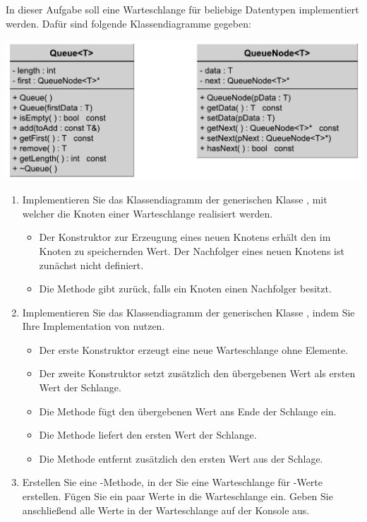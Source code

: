 In dieser Aufgabe soll eine Warteschlange für beliebige Datentypen implementiert werden.
Dafür sind folgende Klassendiagramme gegeben:

\begin{center}
	\includegraphics[keepaspectratio,scale=0.6]{Queue-uml.pdf}
\end{center}

\begin{enumerate}
	\item Implementieren Sie das Klassendiagramm der generischen Klasse , mit welcher die Knoten einer Warteschlange realisiert werden.
	\begin{itemize}
		\item Der Konstruktor zur Erzeugung eines neuen Knotens erhält den im Knoten zu speichernden Wert. Der Nachfolger eines neuen Knotens ist zunächst nicht definiert.
		\item Die Methode  gibt  zurück, falls ein Knoten einen Nachfolger besitzt.
	\end{itemize}
	\item Implementieren Sie das Klassendiagramm der generischen Klasse , indem Sie Ihre Implementation von  nutzen.
	\begin{itemize}
		\item Der erste Konstruktor erzeugt eine neue Warteschlange ohne Elemente.
		\item Der zweite Konstruktor setzt zusätzlich den übergebenen Wert als ersten Wert der Schlange.
		\item Die Methode  fügt den übergebenen Wert ans Ende der Schlange ein.
		\item Die Methode  liefert den ersten Wert der Schlange.
		\item Die Methode  entfernt zusätzlich den ersten Wert aus der Schlage.
	\end{itemize}
	\item Erstellen Sie eine -Methode, in der Sie eine Warteschlange für -Werte erstellen.
	Fügen Sie ein paar Werte in die Warteschlange ein.
	Geben Sie anschließend alle Werte in der Warteschlange auf der Konsole aus.
\end{enumerate}
